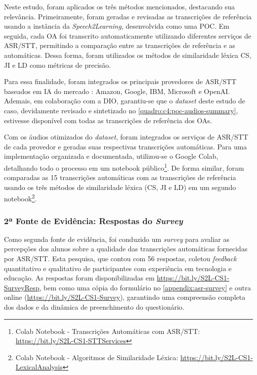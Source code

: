 Neste estudo, foram aplicados os três métodos mencionados, destacando sua relevância. Primeiramente, foram geradas e revisadas as transcrições de referência usando a instância da \textit{Speech2Learning}, desenvolvida como uma POC. Em seguida, cada OA foi transcrito automaticamente utilizando diferentes serviços de ASR/STT, permitindo a comparação entre as transcrições de referência e as automáticas. Dessa forma, foram utilizados os métodos de similaridade léxica CS, JI e LD como métricas de precisão.

Para essa finalidade, foram integrados os principais provedores de ASR/STT baseados em IA do mercado \cite{Gartner2023}: Amazon, Google, IBM, Microsoft e OpenAI. Ademais, em colaboração com a DIO, garantiu-se que o \textit{dataset} deste estudo de caso, devidamente revisado e sintetizado no \autoref{quadro:c4:poc-audios-summary}, estivesse disponível com todas as transcrições de referência dos OAs.

Com os áudios otimizados do \textit{dataset}, foram integrados os serviços de ASR/STT de cada provedor e geradas suas respectivas transcrições automáticas. Para uma implementação organizada e documentada, utilizou-se o Google Colab, detalhando todo o processo em um notebook público\footnote{Colab Notebook - Transcrições Automáticas com ASR/STT: \url{https://bit.ly/S2L-CS1-STTServices}}. De forma similar, foram comparadas as 15 transcrições automáticas com as transcrições de referência usando os três métodos de similaridade léxica (CS, JI e LD) em um segundo notebook\footnote{Colab Notebook - Algoritmos de Similaridade Léxica: \url{https://bit.ly/S2L-CS1-LexicalAnalysis}}.

\subsubsection{2ª Fonte de Evidência: Respostas do \textit{Survey}}

Como segunda fonte de evidência, foi conduzido um \textit{survey} para avaliar as percepções dos alunos sobre a qualidade das transcrições automáticas fornecidas por ASR/STT. Esta pesquisa, que contou com 56 respostas, coletou \textit{feedback} quantitativo e qualitativo de participantes com experiência em tecnologia e educação. As respostas foram disponibilizadas em \url{https://bit.ly/S2L-CS1-SurveyResp}, bem como uma cópia do formulário no \autoref{appendix:asr-survey} e outra online (\url{https://bit.ly/S2L-CS1-Survey}), garantindo uma compreensão completa dos dados e da dinâmica de preenchimento do questionário.

